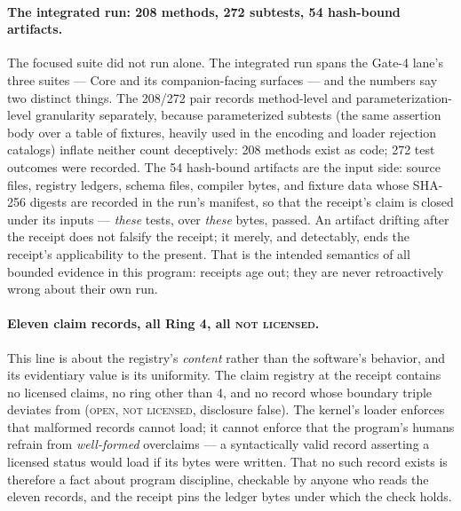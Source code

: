 \paragraph{The integrated run: 208 methods, 272 subtests, 54 hash-bound artifacts.} The focused suite did not run alone. The integrated run spans the Gate-4 lane's three suites --- Core and its companion-facing surfaces --- and the numbers say two distinct things. The 208/272 pair records method-level and parameterization-level granularity separately, because parameterized subtests (the same assertion body over a table of fixtures, heavily used in the encoding and loader rejection catalogs) inflate neither count deceptively: 208 methods exist as code; 272 test outcomes were recorded. The 54 hash-bound artifacts are the input side: source files, registry ledgers, schema files, compiler bytes, and fixture data whose SHA-256 digests are recorded in the run's manifest, so that the receipt's claim is closed under its inputs --- \emph{these} tests, over \emph{these} bytes, passed. An artifact drifting after the receipt does not falsify the receipt; it merely, and detectably, ends the receipt's applicability to the present. That is the intended semantics of all bounded evidence in this program: receipts age out; they are never retroactively wrong about their own run.

\paragraph{Eleven claim records, all Ring 4, all \textsc{not licensed}.} This line is about the registry's \emph{content} rather than the software's behavior, and its evidentiary value is its uniformity. The claim registry at the receipt contains no licensed claims, no ring other than 4, and no record whose boundary triple deviates from (\textsc{open}, \textsc{not licensed}, disclosure false). The kernel's loader enforces that malformed records cannot load; it cannot enforce that the program's humans refrain from \emph{well-formed} overclaims --- a syntactically valid record asserting a licensed status would load if its bytes were written. That no such record exists is therefore a fact about program discipline, checkable by anyone who reads the eleven records, and the receipt pins the ledger bytes under which the check holds.

